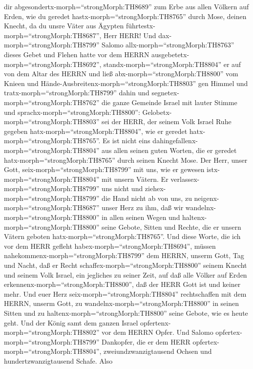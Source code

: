 dir abgesondertx-morph=``strongMorph:TH8689'' zum Erbe aus allen Völkern
auf Erden, wie du geredet hastx-morph=``strongMorph:TH8765'' durch Mose,
deinen Knecht, da du unsre Väter aus Ägypten
führtestx-morph=``strongMorph:TH8687'', Herr HERR!  Und
dax-morph=``strongMorph:TH8799'' Salomo
allx-morph=``strongMorph:TH8763'' dieses Gebet und Flehen hatte vor dem
HERRN ausgebetetx-morph=``strongMorph:TH8692'',
standx-morph=``strongMorph:TH8804'' er auf von dem Altar des HERRN und
ließ abx-morph=``strongMorph:TH8800'' vom Knieen und
Hände-Ausbreitenx-morph=``strongMorph:TH8803'' gen Himmel 
und tratx-morph=``strongMorph:TH8799'' dahin und
segnetex-morph=``strongMorph:TH8762'' die ganze Gemeinde Israel mit
lauter Stimme und sprachx-morph=``strongMorph:TH8800'': 
Gelobetx-morph=``strongMorph:TH8803'' sei der HERR, der seinem Volk
Israel Ruhe gegeben hatx-morph=``strongMorph:TH8804'', wie er geredet
hatx-morph=``strongMorph:TH8765''. Es ist nicht eins
dahingefallenx-morph=``strongMorph:TH8804'' aus allen seinen guten
Worten, die er geredet hatx-morph=``strongMorph:TH8765'' durch seinen
Knecht Mose.  Der Herr, unser Gott,
seix-morph=``strongMorph:TH8799'' mit uns, wie er gewesen
istx-morph=``strongMorph:TH8804'' mit unsern Vätern. Er
verlassex-morph=``strongMorph:TH8799'' uns nicht und
ziehex-morph=``strongMorph:TH8799'' die Hand nicht ab von uns,
 zu neigenx-morph=``strongMorph:TH8687'' unser Herz zu ihm,
daß wir wandelnx-morph=``strongMorph:TH8800'' in allen seinen Wegen und
haltenx-morph=``strongMorph:TH8800'' seine Gebote, Sitten und Rechte,
die er unsern Vätern geboten hatx-morph=``strongMorph:TH8765''.
 Und diese Worte, die ich vor dem HERR gefleht
habex-morph=``strongMorph:TH8694'', müssen
nahekommenx-morph=``strongMorph:TH8799'' dem HERRN, unserm Gott, Tag und
Nacht, daß er Recht schaffex-morph=``strongMorph:TH8800'' seinem Knecht
und seinem Volk Israel, ein jegliches zu seiner Zeit,  auf
daß alle Völker auf Erden erkennenx-morph=``strongMorph:TH8800'', daß
der HERR Gott ist und keiner mehr.  Und euer Herz
seix-morph=``strongMorph:TH8804'' rechtschaffen mit dem HERRN, unserm
Gott, zu wandelnx-morph=``strongMorph:TH8800'' in seinen Sitten und zu
haltenx-morph=``strongMorph:TH8800'' seine Gebote, wie es heute geht.
 Und der König samt dem ganzen Israel
opfertenx-morph=``strongMorph:TH8802'' vor dem HERRN Opfer.
 Und Salomo opfertex-morph=``strongMorph:TH8799''
Dankopfer, die er dem HERR opfertex-morph=``strongMorph:TH8804'',
zweiundzwanzigtausend Ochsen und hundertzwanzigtausend Schafe. Also
